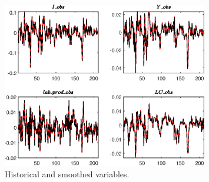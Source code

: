  
\begin{figure}[H]
\centering 
\includegraphics[width=0.80\textwidth]{BRS_growth_ext_comovement/graphs/BRS_growth_ext_comovement_HistoricalAndSmoothedVariables1}
\caption{Historical and smoothed variables.}\label{Fig:HistoricalAndSmoothedVariables:1}
\end{figure}


